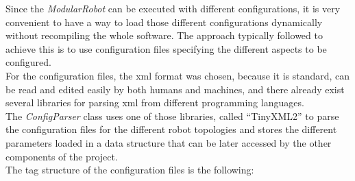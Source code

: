 Since the \emph{ModularRobot} can be executed with different configurations, it is very convenient to have a way to load those different configurations dynamically without recompiling the whole software. The approach typically followed to achieve this is to use configuration files specifying the different aspects to be configured.\\

For the configuration files, the xml format was chosen, because it is standard, can be read and edited easily by both humans and machines, and there already exist several libraries for parsing xml from different programming languages.\\

The \emph{ConfigParser} class uses one of those libraries, called ``TinyXML2'' to parse the configuration files for the different robot topologies and stores the different parameters loaded in a data structure that can be later accessed by the other components of the project.\\

The tag structure of the configuration files is the following:

